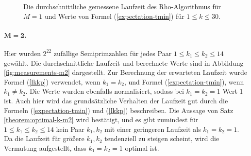 \documentclass[a4paper, 10pt, ngerman]{article}
\begin{document}
\begin{figure}
        \caption{Die durchschnittliche gemessene Laufzeit des Rho-Algorithmus für $M = 1$ und Werte von Formel (\ref{expectation-tmin}) für $1 \le k \le 30$.}
        \label{fig:measurements-m1}
    \end{figure}

    \paragraph{$\bm{M = 2}$.} Hier wurden $2^{22}$ zufällige Semiprimzahlen für jedes Paar $1 \le k_1 \le k_2 \le 14$ gewählt. Die durchschnittliche Laufzeit und berechnete Werte sind in Abbildung \ref{fig:measurements-m2} dargestellt. Zur Berechnung der erwarteten Laufzeit wurde Formel (\ref{lkkp}) verwendet, wenn $k_1 = k_2$, und Formel (\ref{expectation-tmin}), wenn $k_1 \ne k_2$. Die Werte wurden ebenfalls normalisiert, sodass bei $k_1 = k_2 = 1$ Wert 1 ist. Auch hier wird das grundsätzliche Verhalten der Laufzeit gut durch die Formeln (\ref{expectation-tmin}) und (\ref{lkkp}) beschreiben. Die Aussage von Satz \ref{theorem:optimal-k-m2} wird bestätigt, und es gibt zumindest für $1 \le k_1 \le k_2 \le 14$ kein Paar $k_1, k_2$ mit einer geringeren Laufzeit als $k_1 = k_2 = 1$. Da die Laufzeit für größere $k_1, k_2$ tendenziell zu steigen scheint, wird die Vermutung aufgestellt, dass $k_1 = k_2 = 1$ optimal ist.
\end{document}
